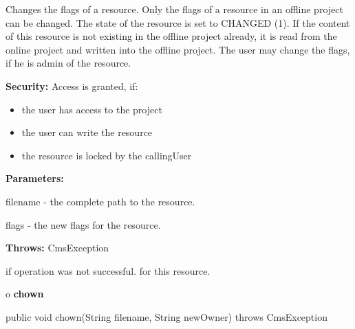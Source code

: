 \begin{description}
\htmlDD Changes the flags of a resource. \htmlBR
Only the flags of a resource in an offline project can be changed. The state
of the resource is set to CHANGED (1). If the content of this resource is not
existing in the offline project already, it is read from the online project
and written into the offline project. The user may change the flags, if he is
admin of the resource.

{\bf Security:} Access is granted, if:

\begin{itemize}
\item the user has access to the project
\item the user can write the resource
\item the resource is locked by the callingUser
\end{itemize}

\begin{description}
\item {\bf Parameters:}

filename - the complete path to the resource.

flags - the new flags for the resource.
\item {\bf Throws:} CmsException

if operation was not successful. for this resource.
\end{description}

\end{description}

o {\bf chown}

\begin{PRE}
 public void chown(String filename,
                   String newOwner) throws CmsException
\end{PRE}


